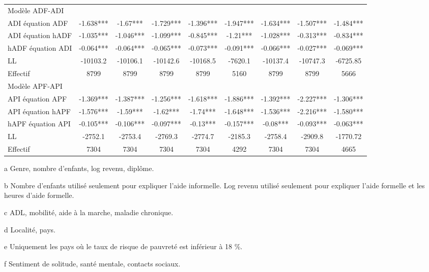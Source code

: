 \begin{Article}
\begin{refsection}[Bonnal]
\begin{table}[t]
{\begin{threeparttable}
\begin{tabular}{l@{\;} S!{\qquad}S!{\qquad}S!{\qquad}S!{\qquad}S!{\qquad}S!{\qquad}S!{\qquad}S!{\qquad}}
Modèle ADF-ADI & & & & & & & & \\
ADI équation ADF & -1.638*** & -1.67*** & -1.729*** & -1.396*** & -1.947*** & -1.634*** & -1.507*** & -1.484***\\
ADI équation hADF & -1.035*** & -1.046*** & -1.099*** & -0.845*** & -1.21*** & -1.028*** & -0.313*** & -0.834***\\
hADF équation ADI & -0.064*** & -0.064*** & -0.065*** & -0.073*** & -0.091*** & -0.066*** & -0.027*** & -0.069***\\
LL & -10103.2 & -10106.1 & -10142.6 & -10168.5 & -7620.1 & -10137.4 & -10747.3 & -6725.85 \\\hline
Effectif & 8799 & 8799 & 8799 & 8799 & 5160 & 8799 & 8799 & 5666\\\hline

Modèle APF-API & & & & & & & & \\
API équation APF & -1.369*** & -1.387*** & -1.256*** & -1.618*** & -1.886*** & -1.392*** & -2.227*** & -1.306*** \\
API équation hAPF & -1.576*** & -1.59*** & -1.62*** & -1.74*** & -1.648*** & -1.536*** & -2.216*** & -1.580***\\
hAPF équation API & -0.105*** & -0.106*** & -0.097*** & -0.13*** & -0.157*** & -0.08*** & -0.093*** & -0.063***\\
LL & -2752.1 & -2753.4 & -2769.3 & -2774.7 & -2185.3 & -2758.4 & -2909.8 & -1770.72\\\hline
Effectif & 7304 & 7304 & 7304 & 7304 & 4292 & 7304 & 7304 & 4665\\\hline
\bottomrule
\end{tabular}
\begin{tablenotes}
	\item[a] Genre, nombre d'enfants, log revenu, diplôme.
	\item[b] Nombre d'enfants utilisé seulement pour expliquer l'aide informelle. Log revenu utilisé seulement pour expliquer l'aide formelle et les heures d'aide formelle.
	\item[c] ADL, mobilité, aide à la marche, maladie chronique.
	\item[d] Localité, pays.
	\item[e] Uniquement les pays où le taux de risque de pauvreté est inférieur à 18 \%.
	\item[f] Sentiment de solitude, santé mentale, contacts sociaux.
\end{tablenotes}
\end{threeparttable}
}
\label{robustesseB}

\end{table}
\end{refsection}
\end{Article}
